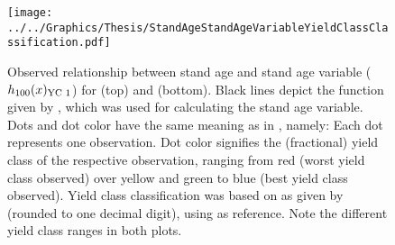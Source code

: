 \begin{figure}[t]
  \texttt{[image: ../../Graphics/Thesis/StandAgeStandAgeVariableYieldClassClassification.pdf]}
  \caption{Observed relationship between stand age and stand age variable (\(h_{100}(x)_{\text{YC 1}}{}\)) for \Beech{} (top) and \Spruce{} (bottom).  Black lines depict the function given by , which was used for calculating the stand age variable.  Dots and dot color have the same meaning as in , namely:  Each dot represents one observation.  Dot color signifies the (fractional) yield class of the respective observation, ranging from red (worst yield class observed) over yellow and green to blue (best yield class observed).  Yield class classification was based on \ProductivityIndexText{} as given by  (rounded to one decimal digit), using  as reference.  Note the different yield class ranges in both plots.}
  \label{fig:StandAgeStandAgeVariableYieldClassClassification}
\end{figure}

